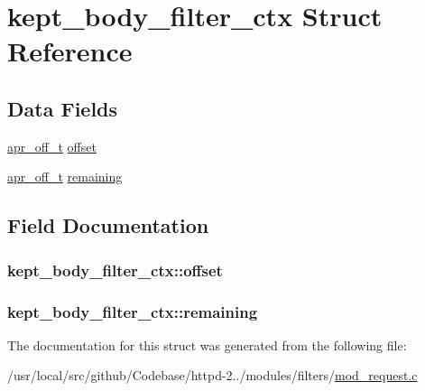 \hypertarget{structkept__body__filter__ctx}{}\section{kept\+\_\+body\+\_\+filter\+\_\+ctx Struct Reference}
\label{structkept__body__filter__ctx}
\subsection*{Data Fields}
\begin{DoxyCompactItemize}
\item 
\hyperlink{group__apr__platform_ga6938af9075cec15c88299109381aa984}{apr\+\_\+off\+\_\+t} \hyperlink{structkept__body__filter__ctx_a9c0f63b19a565edded70a9cf0be94eb7}{offset}
\item 
\hyperlink{group__apr__platform_ga6938af9075cec15c88299109381aa984}{apr\+\_\+off\+\_\+t} \hyperlink{structkept__body__filter__ctx_ae6246057cb352358f17288574bea222b}{remaining}
\end{DoxyCompactItemize}


\subsection{Field Documentation}
\subsubsection[{\texorpdfstring{offset}{offset}}]{ kept\+\_\+body\+\_\+filter\+\_\+ctx\+::offset}\hypertarget{structkept__body__filter__ctx_a9c0f63b19a565edded70a9cf0be94eb7}{}\label{structkept__body__filter__ctx_a9c0f63b19a565edded70a9cf0be94eb7}
\subsubsection[{\texorpdfstring{remaining}{remaining}}]{ kept\+\_\+body\+\_\+filter\+\_\+ctx\+::remaining}\hypertarget{structkept__body__filter__ctx_ae6246057cb352358f17288574bea222b}{}\label{structkept__body__filter__ctx_ae6246057cb352358f17288574bea222b}


The documentation for this struct was generated from the following file\+:\begin{DoxyCompactItemize}
\item 
/usr/local/src/github/\+Codebase/httpd-\/2../modules/filters/\hyperlink{mod__request_8c}{mod\+\_\+request.\+c}\end{DoxyCompactItemize}
